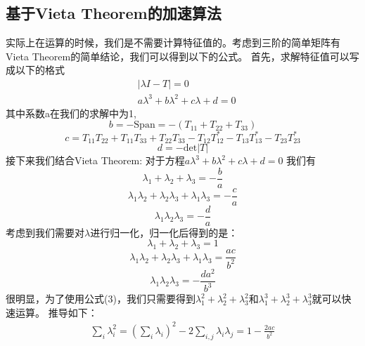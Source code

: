 \documentclass{article}
\begin{document}
\subsection{基于Vieta Theorem的加速算法}
实际上在运算的时候，我们是不需要计算特征值的。考虑到三阶的简单矩阵有Vieta Theorem的简单结论，我们可以得到以下的公式。
首先，求解特征值可以写成以下的格式
\begin{equation}
\begin{aligned}
&|\lambda I - T| = 0 \\
&a\lambda^3 + b\lambda^2 + c\lambda + d = 0
\end{aligned}
\end{equation}
其中系数a在我们的求解中为1,
\begin{equation}
b = -\mbox{Span} = - (T_{11} + T_{22} + T_{33})
\end{equation}
\begin{equation}
c = T_{11} T_{22} +T_{11}T_{33} + T_{22}T_{33} - T_{12}T_{12}^*
- T_{13}T_{13}^*- T_{23}T_{23}^*
\end{equation}
\begin{equation}
d = -\mbox{det}|T|
\end{equation}
接下来我们结合Vieta Theorem:
对于方程\(a\lambda^3 + b\lambda^2 + c\lambda + d = 0\)
我们有
\begin{equation}
\lambda_1 + \lambda_2 + \lambda_3 = -\frac{b}{a}
\end{equation}
\begin{equation}
\lambda_1\lambda_2 + \lambda_2\lambda_3 +\lambda_1 \lambda_3 = -\frac{c}{a}
\end{equation}
\begin{equation}
\lambda_1\lambda_2\lambda_3 = -\frac{d}{a}
\end{equation}
考虑到我们需要对\(\lambda\)进行归一化，归一化后得到的是：
\begin{equation}
\lambda_1 + \lambda_2 + \lambda_3 = 1
\end{equation}
\begin{equation}
\lambda_1\lambda_2 + \lambda_2\lambda_3 +\lambda_1 \lambda_3 = \frac{ac}{b^2}
\end{equation}
\begin{equation}
\lambda_1\lambda_2\lambda_3 = -\frac{da^2}{b^3}
\end{equation}
很明显，为了使用公式(3)，我们只需要得到\(\lambda_1^2 + \lambda_2^2 + \lambda_3^2\)和\(\lambda_1^3 + \lambda_2^3 + \lambda_3^3\)就可以快速运算。
推导如下：
\begin{equation}
\begin{aligned}
\sum_i\lambda_i^2 = \left(\sum_i\lambda_i\right)^2 - 2\sum_{i,j}\lambda_i\lambda_j = 1 - \frac{2ac}{b^2}
\end{aligned}
\end{equation}
\end{document}
